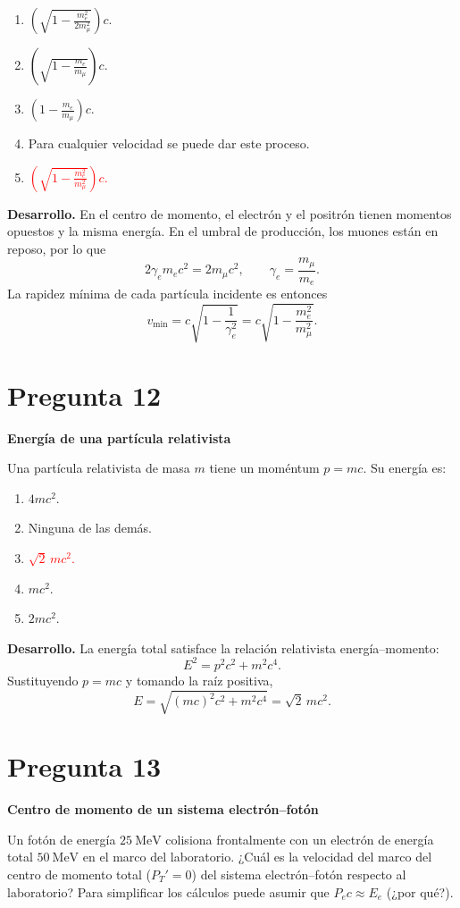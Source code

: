\documentclass[a4paper,11pt]{article}
\newcommand{\pregunta}[2]{\section*{Pregunta #1}\textbf{#2}\par}
\begin{document}
\begin{enumerate}[itemsep=0.3em]
    \item $\displaystyle \left(\sqrt{1-\frac{m_e^2}{2m_\mu^2}}\right)c$.
    \item $\displaystyle \left(\sqrt{1-\frac{m_e}{m_\mu}}\right)c$.
    \item $\displaystyle \left(1-\frac{m_e}{m_\mu}\right)c$.
    \item Para cualquier velocidad se puede dar este proceso.
    \item \textcolor{red}{$\displaystyle \left(\sqrt{1-\frac{m_e^2}{m_\mu^2}}\right)c$.}
\end{enumerate}

\begin{figure}[H]
\centering

\end{figure}

\textbf{Desarrollo.} En el centro de momento, el electrón y el positrón tienen momentos opuestos y la misma energía. En el umbral de producción, los muones están en reposo, por lo que
\[
2\gamma_e m_ec^2=2m_\mu c^2,
\qquad \gamma_e=\frac{m_\mu}{m_e}.
\]
La rapidez mínima de cada partícula incidente es entonces
\[
v_{\min}=c\sqrt{1-\frac{1}{\gamma_e^2}}
=c\sqrt{1-\frac{m_e^2}{m_\mu^2}}.
\]
\parencite[Sec. 5.3.1, pp. 140--143; Sec. 5.4, pp. 158--159]{chaparro2026}

\pregunta{12}{Energía de una partícula relativista}

Una partícula relativista de masa $m$ tiene un moméntum $p=mc$. Su energía es:

\begin{enumerate}
    \item $4mc^2$.
    \item Ninguna de las demás.
    \item \textcolor{red}{$\sqrt{2}\,mc^2$.}
    \item $mc^2$.
    \item $2mc^2$.
\end{enumerate}

\textbf{Desarrollo.} La energía total satisface la relación relativista energía--momento:
\[
E^2=p^2c^2+m^2c^4.
\]
Sustituyendo $p=mc$ y tomando la raíz positiva,
\[
E=\sqrt{(mc)^2c^2+m^2c^4}=\sqrt{2}\,mc^2.
\]
\parencite[Sec. 5.4, pp. 158--159]{chaparro2026}


\pregunta{13}{Centro de momento de un sistema electrón--fotón}

Un fotón de energía $25\ \mathrm{MeV}$ colisiona frontalmente con un electrón de energía total $50\ \mathrm{MeV}$ en el marco del laboratorio. ¿Cuál es la velocidad del marco del centro de momento total ($P_T'=0$) del sistema electrón--fotón respecto al laboratorio? Para simplificar los cálculos puede asumir que $P_ec\approx E_e$ (¿por qué?).
\end{document}
